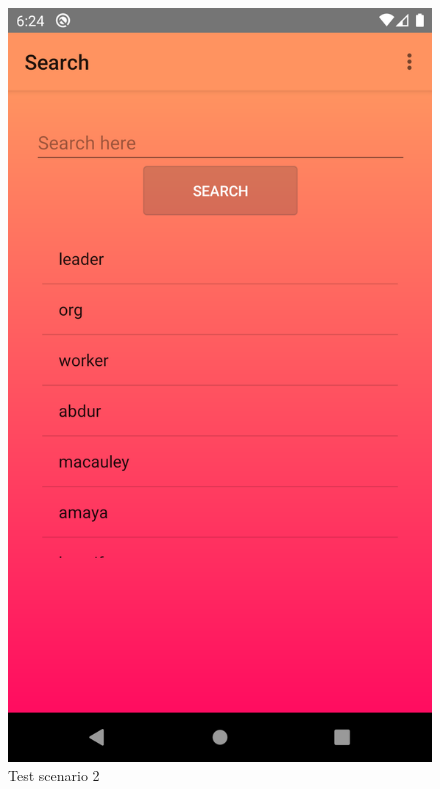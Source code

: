 	 		\begin{figure}[H]
	 			\includegraphics[width=\linewidth]{images/test_Screens/test_scenario_2-3.png}
	 			\caption{Test scenario 2}
	 			\label{fig:espresso_2_3}
	 		\end{figure}
	 		

